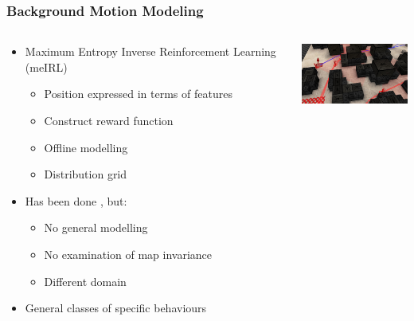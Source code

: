 \documentclass{beamer}
\begin{document}
\begin{frame}
    \frametitle{Background Motion Modeling}
    \begin{minipage}[0.5\textheight]{\textwidth}
        \begin{columns}[T]
            \begin{column}{0.7\textwidth}
                \begin{itemize}
        \item Maximum Entropy Inverse Reinforcement Learning (meIRL)
            \begin{itemize}
                \item Position expressed in terms of features
                \item Construct reward function 
                \item Offline modelling
                \item Distribution grid
            \end{itemize}
        \item Has been done \citep{6374144}, but:
            \begin{itemize}
                \item No general modelling
                \item No examination of map invariance
                \item Different domain
                    \end {itemize}
                \item  General classes of specific behaviours
                \end{itemize}
            \end{column}
            \begin{column}{1\textwidth}
                \includegraphics[width=4cm]{CTF_Sandbox}
            \end{column}
        \end{columns}
    \end{minipage}
\end{frame}
\end{document}
